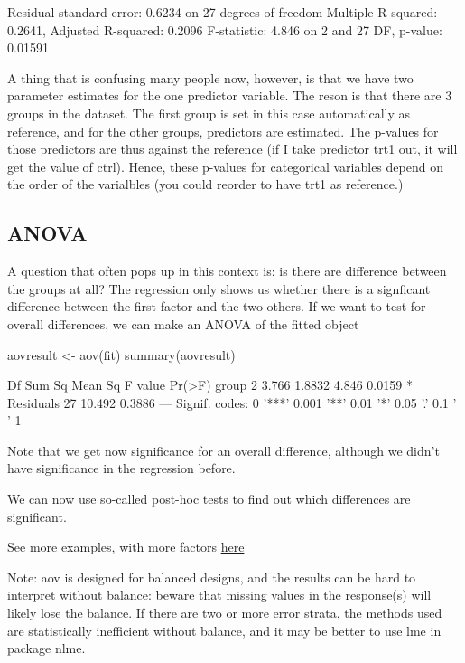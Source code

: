 \documentclass[a4paper,twoside]{tufte-book}\usepackage[]{graphicx}\usepackage[]{color}
\begin{document}
\begin{Anhang}
\begin{Schunk}
\begin{Soutput}
Residual standard error: 0.6234 on 27 degrees of freedom
Multiple R-squared:  0.2641,	Adjusted R-squared:  0.2096 
F-statistic: 4.846 on 2 and 27 DF,  p-value: 0.01591
\end{Soutput}
\end{Schunk}

A thing that is confusing many people now, however, is that we have two parameter estimates for the one predictor variable. The reson is that there are 3 groups in the dataset. The first group is set in this case automatically as reference, and for the other groups, predictors are estimated. The p-values for those predictors are thus against the reference (if I take predictor trt1 out, it will get the value of ctrl). Hence, these p-values for categorical variables depend on the order of the varialbles (you could reorder to have trt1 as reference.)


\subsection{ANOVA}

A question that often pops up in this context is: is there are difference between the groups at all? The regression only shows us whether there is a signficant difference between the first factor and the two others. If we want to test for overall differences, we can make an ANOVA of the fitted object

\begin{Schunk}
\begin{Sinput}
aovresult <- aov(fit)
summary(aovresult)
\end{Sinput}
\begin{Soutput}
            Df Sum Sq Mean Sq F value Pr(>F)  
group        2  3.766  1.8832   4.846 0.0159 *
Residuals   27 10.492  0.3886                 
---
Signif. codes:  0 '***' 0.001 '**' 0.01 '*' 0.05 '.' 0.1 ' ' 1
\end{Soutput}
\end{Schunk}

Note that we get now significance for an overall difference, although we didn't have significance in the regression before. 

We can now use so-called post-hoc tests to find out which differences are significant.

See more examples, with more factors \href{http://www.statmethods.net/stats/anova.html}{here} 

Note: aov is designed for balanced designs, and the results can be hard to interpret without balance: beware that missing values in the response(s) will likely lose the balance. If there are two or more error strata, the methods used are statistically inefficient without balance, and it may be better to use lme in package nlme.


\end{Anhang}
\end{document}
